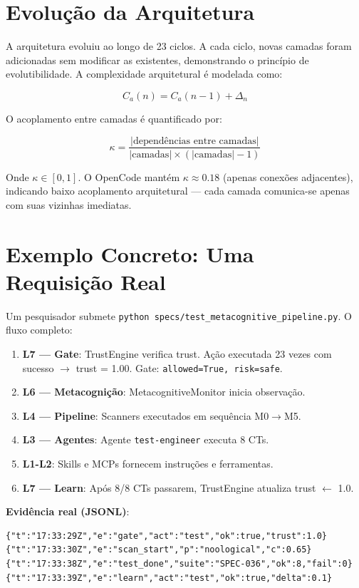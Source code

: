 \section{Evolução da Arquitetura}

A arquitetura evoluiu ao longo de 23 ciclos. A cada ciclo, novas camadas foram adicionadas sem modificar as existentes, demonstrando o princípio de evolutibilidade. A complexidade arquitetural é modelada como:

\begin{equation}
C_a(n) = C_a(n-1) + \Delta_n
\label{eq:arch_evolution}
\end{equation}

O acoplamento entre camadas é quantificado por:

\begin{equation}
\kappa = \frac{|\text{dependências entre camadas}|}{|\text{camadas}| \times (|\text{camadas}| - 1)}
\label{eq:acoplamento}
\end{equation}

Onde $\kappa \in [0,1]$. O OpenCode mantém $\kappa \approx 0.18$ (apenas conexões adjacentes), indicando baixo acoplamento arquitetural — cada camada comunica-se apenas com suas vizinhas imediatas.

\section{Exemplo Concreto: Uma Requisição Real}

Um pesquisador submete \texttt{python specs/test\_metacognitive\_pipeline.py}. O fluxo completo:

\begin{enumerate}
    \item \textbf{L7 — Gate}: TrustEngine verifica trust. Ação executada 23 vezes com sucesso $\rightarrow$ trust = 1.00. Gate: \texttt{allowed=True, risk=safe}.
    \item \textbf{L6 — Metacognição}: MetacognitiveMonitor inicia observação.
    \item \textbf{L4 — Pipeline}: Scanners executados em sequência M0$\rightarrow$M5.
    \item \textbf{L3 — Agentes}: Agente \texttt{test-engineer} executa 8 CTs.
    \item \textbf{L1-L2}: Skills e MCPs fornecem instruções e ferramentas.
    \item \textbf{L7 — Learn}: Após 8/8 CTs passarem, TrustEngine atualiza trust $\leftarrow$ 1.0.
\end{enumerate}

\textbf{Evidência real (JSONL)}:
\begin{verbatim}
{"t":"17:33:29Z","e":"gate","act":"test","ok":true,"trust":1.0}
{"t":"17:33:30Z","e":"scan_start","p":"noological","c":0.65}
{"t":"17:33:38Z","e":"test_done","suite":"SPEC-036","ok":8,"fail":0}
{"t":"17:33:39Z","e":"learn","act":"test","ok":true,"delta":0.1}
\end{verbatim}
